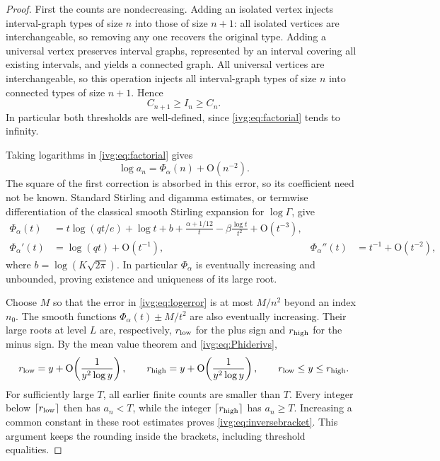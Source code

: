 \documentclass[11pt,letterpaper]{article}
\theoremstyle{definition}\newtheorem{definition}[theorem]{Definition}
\theoremstyle{remark}\newtheorem{remark}[theorem]{Remark}
\newcommand{\OO}{\mathrm O}
\newcommand{\ceil}[1]{\left\lceil #1\right\rceil}
\begin{document}
\begin{proof}
First the counts are nondecreasing. Adding an isolated vertex injects interval-graph types of size $n$ into those of size $n+1$: all isolated vertices are interchangeable, so removing any one recovers the original type. Adding a universal vertex preserves interval graphs, represented by an interval covering all existing intervals, and yields a connected graph. All universal vertices are interchangeable, so this operation injects all interval-graph types of size $n$ into connected types of size $n+1$. Hence
\begin{equation}\label{ivg:eq:monotone}
 C_{n+1}\ge I_n\ge C_n.
\end{equation}
In particular both thresholds are well-defined, since \eqref{ivg:eq:factorial} tends to infinity.

Taking logarithms in \eqref{ivg:eq:factorial} gives
\begin{equation}\label{ivg:eq:logerror}
 \log a_n=\Phi_\alpha(n)+\OO(n^{-2}).
\end{equation}
The square of the first correction is absorbed in this error, so its coefficient need not be known. Standard Stirling and digamma estimates, or termwise differentiation of the classical smooth Stirling expansion for $\log\Gamma$, give
\begin{align}
 \Phi_\alpha(t)&=t\log(qt/e)+\log t+b+\frac{\alpha+1/12}{t}
 -\beta\frac{\log t}{t^2}+\OO(t^{-3}),\label{ivg:eq:Phistirling}\\
 \Phi_\alpha'(t)&=\log(qt)+\OO(t^{-1}),&
 \Phi_\alpha''(t)&=t^{-1}+\OO(t^{-2}),\label{ivg:eq:Phiderivs}
\end{align}
where $b=\log(K\sqrt{2\pi})$. In particular $\Phi_\alpha$ is eventually increasing and unbounded, proving existence and uniqueness of its large root.

Choose $M$ so that the error in \eqref{ivg:eq:logerror} is at most $M/n^2$ beyond an index $n_0$. The smooth functions $\Phi_\alpha(t)\pm M/t^2$ are also eventually increasing. Their large roots at level $L$ are, respectively, $r_{\rm low}$ for the plus sign and $r_{\rm high}$ for the minus sign. By the mean value theorem and \eqref{ivg:eq:Phiderivs},
\[
 r_{\rm low}=y+\OO\!\left(\frac1{y^2\log y}\right),\qquad
 r_{\rm high}=y+\OO\!\left(\frac1{y^2\log y}\right),
 \qquad r_{\rm low}\le y\le r_{\rm high}.
\]
For sufficiently large $T$, all earlier finite counts are smaller than $T$. Every integer below $\ceil{r_{\rm low}}$ then has $a_n<T$, while the integer $\ceil{r_{\rm high}}$ has $a_n\ge T$. Increasing a common constant in these root estimates proves \eqref{ivg:eq:inversebracket}. This argument keeps the rounding inside the brackets, including threshold equalities.


\end{proof}
\end{document}
